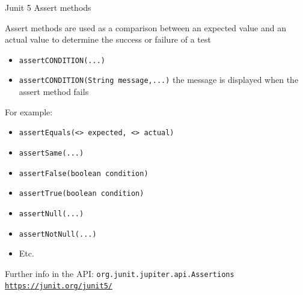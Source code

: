 \documentclass[11pt, xcolor=svgnames]{beamer}
\begin{document}

\begin{frame}{Junit 5 Assert methods}

Assert methods are used as a comparison between an expected value and an actual value to determine the success or failure of a test
  
      \begin{itemize}
        \item \texttt{assertCONDITION(...)}
        \item \texttt{assertCONDITION(String message,...)}  the message is displayed when the assert method fails
      \end{itemize}
  
For example:
      \begin{itemize}
        \item \texttt{assertEquals(<> expected, <> actual)}
        \item \texttt{assertSame(...)} 
        \item \texttt{assertFalse(boolean condition)}
        \item \texttt{assertTrue(boolean condition)}
        \item \texttt{assertNull(...)}
        \item \texttt{assertNotNull(...)}
        \item Etc.
      \end{itemize}

      Further info in the API: \texttt{org.junit.jupiter.api.Assertions}\\
      \texttt{\url{https://junit.org/junit5/}}
  
  \end{frame}

\end{document}
